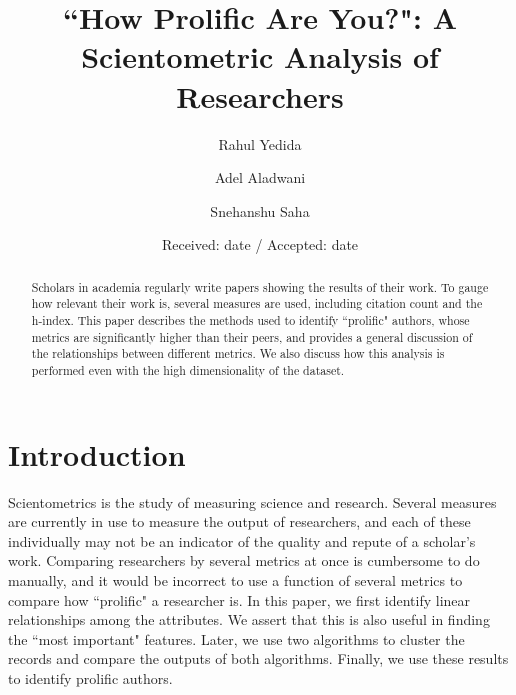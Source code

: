 \documentclass[smallextended]{svjour3}
\begin{document}
\title{``How Prolific Are You?": A Scientometric Analysis of Researchers}

\author{Rahul Yedida \and Adel Aladwani \and Snehanshu Saha}


\date{Received: date / Accepted: date}
	\maketitle

\begin{abstract}
Scholars in academia regularly write papers showing the results of their work. To gauge how relevant their work is, several measures are used, including citation count and the h-index. This paper describes the methods used to identify ``prolific" authors, whose metrics are significantly higher than their peers, and provides a general discussion of the relationships between different metrics. We also discuss how this analysis is performed even with the high dimensionality of the dataset.

\end{abstract}
	
	\section{Introduction}
	Scientometrics is the study of measuring science and research. Several measures are currently in use to measure the output of researchers, and each of these individually may not be an indicator of the quality and repute of a scholar's work. Comparing researchers by several metrics at once is cumbersome to do manually, and it would be incorrect to use a function of several metrics to compare how ``prolific" a researcher is. In this paper, we first identify linear relationships among the attributes. We assert that this is also useful in finding the ``most important" features. Later, we use two algorithms to cluster the records and compare the outputs of both algorithms. Finally, we use these results to identify prolific authors.
	
\end{document}
